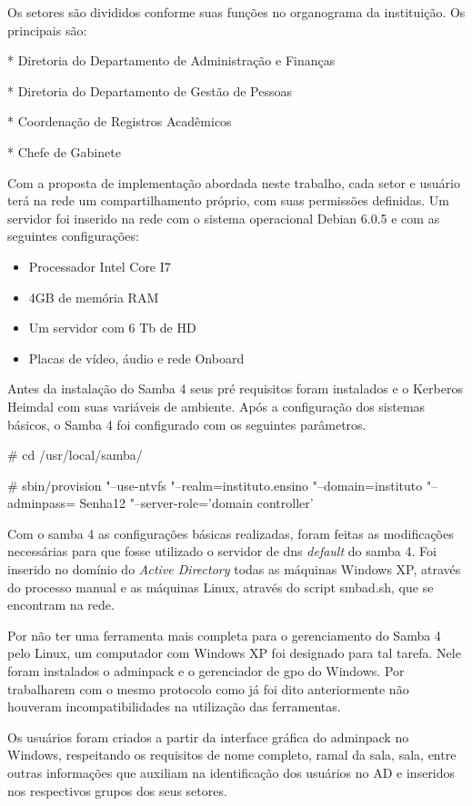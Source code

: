 \pagebreak
          				
Os setores são divididos conforme suas funções no organograma da instituição. Os principais são:

* Diretoria do Departamento de Administração e Finanças

* Diretoria do Departamento de Gestão de Pessoas

* Coordenação de Registros Acadêmicos

* Chefe de Gabinete

Com a proposta de implementação abordada neste trabalho, cada setor e usuário terá na rede um compartilhamento próprio, com suas permissões definidas. Um servidor foi inserido na rede com o sistema operacional Debian 6.0.5 e com as seguintes configurações:

\begin{itemize}
	\item{Processador Intel Core I7\textregistered}
	\item{4GB de memória RAM}
	\item{Um servidor com 6 Tb de HD}
	\item{Placas de vídeo, áudio e rede Onboard}
\end{itemize}

Antes da instalação do Samba 4 seus pré requisitos foram instalados e o Kerberos Heimdal com suas variáveis de ambiente.
Após a configuração dos sistemas básicos, o Samba 4 foi configurado com os seguintes parâmetros.

\# cd /usr/local/samba/

\# sbin/provision "--use-ntvfs "--realm=instituto.ensino "--domain=instituto "--adminpass= Senha12 "--server-role=’domain controller’

Com o samba 4 as configurações básicas realizadas, foram feitas as modificações necessárias para que fosse utilizado o servidor de dns \textit{default} do samba 4. Foi inserido no domínio do \textit{Active Directory} todas as máquinas Windows XP, através do processo manual e as máquinas Linux, através do script smbad.sh, que se encontram na rede.

Por não ter uma ferramenta mais completa para o gerenciamento do Samba 4 pelo Linux, um computador com Windows XP foi designado para tal tarefa. Nele foram instalados o adminpack e o gerenciador de gpo do Windows. Por trabalharem com o mesmo protocolo como já foi dito anteriormente não houveram incompatibilidades na utilização das ferramentas.

Os usuários foram criados a partir da interface gráfica do adminpack no Windows, respeitando os requisitos de nome completo, ramal da sala, sala, entre outras informações que auxiliam na identificação dos usuários no AD e inseridos nos respectivos grupos dos seus setores.

